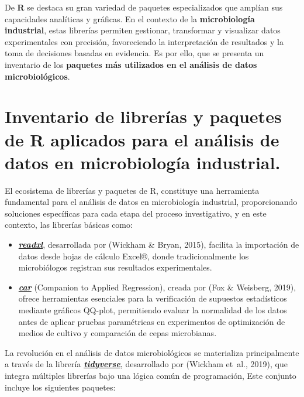 \documentclass[
  spanish,
  letterpaper,
  DIV=11,
  numbers=noendperiod]{scrreprt}
\begin{document}
De \textbf{R} se destaca su gran variedad de paquetes especializados que
amplían sus capacidades analíticas y gráficas. En el contexto de la
\textbf{microbiología industrial}, estas librerías permiten gestionar,
transformar y visualizar datos experimentales con precisión,
favoreciendo la interpretación de resultados y la toma de decisiones
basadas en evidencia. Es por ello, que se presenta un inventario de los
\textbf{paquetes más utilizados en el análisis de datos
microbiológicos}.

\section{Inventario de librerías y paquetes de R aplicados para el
análisis de datos en microbiología
industrial.}\label{inventario-de-libreruxedas-y-paquetes-de-r-aplicados-para-el-anuxe1lisis-de-datos-en-microbiologuxeda-industrial.}

El ecosistema de librerías y paquetes de R, constituye una herramienta
fundamental para el análisis de datos en microbiología industrial,
proporcionando soluciones específicas para cada etapa del proceso
investigativo, y en este contexto, las librerías básicas como:

\begin{itemize}
\item
  \href{https://readxl.tidyverse.org/}{\textbf{\emph{readxl}}},
  desarrollada por (Wickham \& Bryan, 2015), facilita la importación de
  datos desde hojas de cálculo Excel®, donde tradicionalmente los
  microbiólogos registran sus resultados experimentales.
\item
  \href{https://cran.r-project.org/web/packages/car/index.html}{\textbf{\emph{car}}}
  (Companion to Applied Regression), creada por (Fox \& Weisberg, 2019),
  ofrece herramientas esenciales para la verificación de supuestos
  estadísticos mediante gráficos QQ-plot, permitiendo evaluar la
  normalidad de los datos antes de aplicar pruebas paramétricas en
  experimentos de optimización de medios de cultivo y comparación de
  cepas microbianas.
\end{itemize}

La revolución en el análisis de datos microbiológicos se materializa
principalmente a través de la librería
\href{https://tidyverse.tidyverse.org/}{\textbf{\emph{tidyverse}}},
desarrollado por (Wickham et~al., 2019), que integra múltiples librerías
bajo una lógica común de programación, Este conjunto incluye los
siguientes paquetes:
\end{document}
